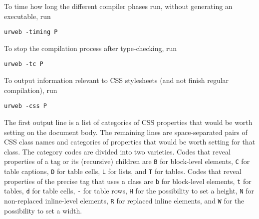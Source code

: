 \documentclass{article}
\newcommand{\cd}[1]{\texttt{#1}}
\begin{document}
To time how long the different compiler phases run, without generating an executable, run
\begin{verbatim}
urweb -timing P
\end{verbatim}

To stop the compilation process after type-checking, run
\begin{verbatim}
urweb -tc P
\end{verbatim}

To output information relevant to CSS stylesheets (and not finish regular compilation), run
\begin{verbatim}
urweb -css P
\end{verbatim}
The first output line is a list of categories of CSS properties that would be worth setting on the document body.  The remaining lines are space-separated pairs of CSS class names and categories of properties that would be worth setting for that class.  The category codes are divided into two varieties.  Codes that reveal properties of a tag or its (recursive) children are \cd{B} for block-level elements, \cd{C} for table captions, \cd{D} for table cells, \cd{L} for lists, and \cd{T} for tables.  Codes that reveal properties of the precise tag that uses a class are \cd{b} for block-level elements, \cd{t} for tables, \cd{d} for table cells, \cd{-} for table rows, \cd{H} for the possibility to set a height, \cd{N} for non-replaced inline-level elements, \cd{R} for replaced inline elements, and \cd{W} for the possibility to set a width.
\end{document}
